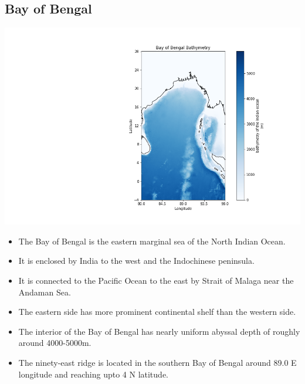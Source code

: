 \documentclass[16pt]{article}
\begin{document}
\subsection{Bay of Bengal}

\begin{center}
    \includegraphics[width=1.0\textwidth]{Bay_of_Bengal_Bathymetry.png}    
\end{center}

\begin{itemize}
    \item The Bay of Bengal is the eastern marginal sea of the North Indian Ocean.
    \item It is enclosed by India to the west and the Indochinese peninsula.
    \item It is connected to the Pacific Ocean to the east by Strait of Malaga near the Andaman Sea.
    \item The eastern side has more prominent continental shelf than the western side.
    \item The interior of the Bay of Bengal has nearly uniform abyssal depth of roughly around 4000-5000m.
    \item The ninety-east ridge is located in the southern Bay of Bengal around 89.0 E longitude and reaching upto 4 N latitude.
\end{itemize}
\end{document}
